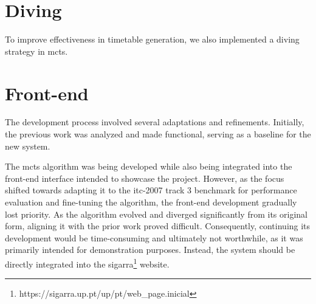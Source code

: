 \section{Diving}

To improve effectiveness in timetable generation, we also implemented a diving strategy in \ac{mcts}.

\section{Front-end}

The development process involved several adaptations and refinements. Initially, the previous work was analyzed and made functional, serving as a baseline for the new system. 

The \ac{mcts} algorithm was being developed while also being integrated into the front-end  interface intended to showcase the project. However, as the focus shifted towards adapting it to the \ac{itc-2007} track 3 benchmark for performance evaluation and fine-tuning the algorithm, the front-end development gradually lost priority. As the algorithm evolved and diverged significantly from its original form, aligning it with the prior work proved difficult. Consequently, continuing its development would be time-consuming and ultimately not worthwhile, as it was primarily intended for demonstration purposes. Instead, the system should be directly integrated into the sigarra\footnote{https://sigarra.up.pt/up/pt/web_page.inicial} website.

